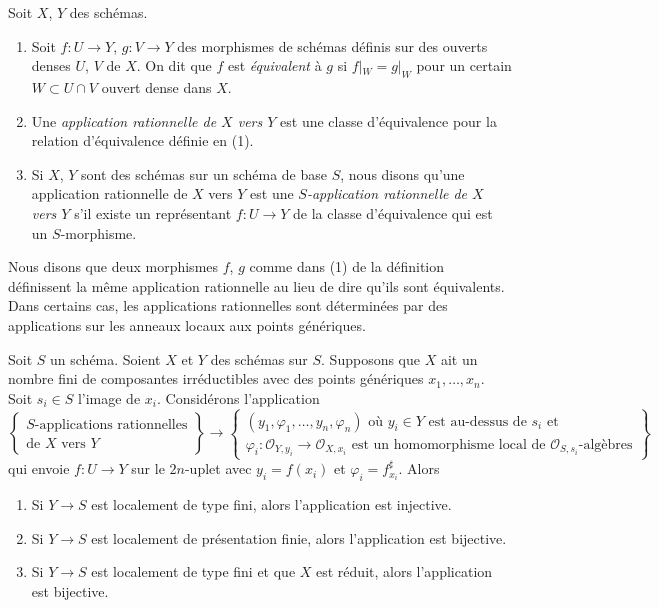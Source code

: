 \begin{definition}
\label{definition-rational-map}
Soit $X$, $Y$ des schémas.
\begin{enumerate}
\item Soit $f : U \to Y$, $g : V \to Y$ des morphismes de schémas définis sur des ouverts denses $U$,
$V$ de $X$. On dit que $f$ est {\it
équivalent} à $g$ si $f|_W = g|_W$ pour un certain $W \subset U \cap V$ ouvert
dense dans $X$.
\item Une {\it application rationnelle de $X$
vers $Y$} est une classe d'équivalence pour la relation d'équivalence définie en (1).
\item Si $X$, $Y$ sont des schémas sur un schéma de base $S$, nous disons qu'une
application rationnelle de $X$ vers $Y$ est une {\it $S$-application
rationnelle de $X$ vers $Y$} s'il existe un représentant $f : U \to Y$ de la classe
d'équivalence qui est un $S$-morphisme.
\end{enumerate}
\end{definition}

\noindent
Nous disons que deux morphismes $f$, $g$ comme dans (1) de la définition définissent
la même application rationnelle au lieu de dire qu'ils sont équivalents. Dans certains cas,
les applications rationnelles sont déterminées par des applications sur les anneaux locaux
aux points génériques.

\begin{lemma}
\label{lemma-rational-map-finite-presentation}
Soit $S$ un schéma. Soient $X$ et $Y$ des schémas sur $S$. Supposons
que $X$ ait un nombre fini de composantes irréductibles avec des
points génériques $x_1, \ldots, x_n$. Soit $s_i \in S$ l'image de $x_i$. Considérons
l'application
$$
\left\{
\begin{matrix}
S\text{-applications rationnelles} \\
\text{de }X\text{ vers }Y
\end{matrix}
\right\}
\longrightarrow
\left\{
\begin{matrix}
(y_1, \varphi_1, \ldots, y_n, \varphi_n)\text{ où }
y_i \in Y\text{ est au-dessus de }s_i\text{ et}\\
\varphi_i : \mathcal{O}_{Y, y_i} \to \mathcal{O}_{X, x_i}
\text{ est un homomorphisme local de }\mathcal{O}_{S, s_i}\text{-algèbres}
\end{matrix}
\right\}
$$
qui envoie $f : U \to Y$ sur le $2n$-uplet
avec $y_i = f(x_i)$ et $\varphi_i = f^\sharp_{x_i}$. Alors
\begin{enumerate}
\item Si $Y \to S$ est localement de type fini, alors l'application est injective.
\item Si $Y \to S$ est localement de présentation finie, alors l'application est bijective.
\item Si $Y \to S$ est localement de type fini et que $X$ est réduit, alors
l'application est bijective.
\end{enumerate}
\end{lemma}


